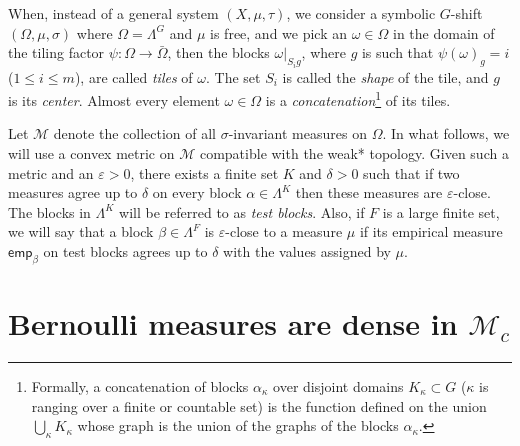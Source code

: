 \documentclass{amsart}
\newtheorem{fact}[thm]{Fact}
\theoremstyle{remark}
\def \M {\mathcal M}
\def \eps {\varepsilon}
\def \im {invariant measure}
\def \inv {invariant}
\def \emp{\mathsf{emp}}
\begin{document}
\smallskip
When, instead of a general system $(X,\mu,\tau)$, we consider a symbolic $G$-shift $(\Omega,\mu,\sigma)$ where $\Omega=\Lambda^G$ and $\mu$ is free, and we pick an $\omega\in\Omega$ in the domain of the tiling factor $\psi:\Omega\to\bar\Omega$, then the blocks $\omega|_{S_ig}$, where $g$ is such that $\psi(\omega)_g=i$ ($1\le i\le m$), are called \emph{tiles} of $\omega$. The set $S_i$ is called the \emph{shape} of the tile, and $g$ is its \emph{center}. Almost every element $\omega\in\Omega$ is a \emph{concatenation}\footnote{Formally, a concatenation of blocks $\alpha_\kappa$ over disjoint domains $K_\kappa\subset G$ ($\kappa$ is ranging over a finite or countable set) is the function defined on the union $\bigcup_\kappa K_\kappa$ whose graph is the union of the graphs of the blocks $\alpha_\kappa$.} of its tiles.
\smallskip

Let $\M$ denote the collection of all $\sigma$-\im s on $\Omega$.
In what follows, we will use a convex metric on $\M$ compatible with the weak* topology. Given such a metric and an $\eps>0$, there exists a finite set $K$ and $\delta>0$ such that if two measures agree up to $\delta$ on every block $\alpha\in\Lambda^K$  then these measures are $\eps$-close. The blocks in $\Lambda^K$ will be referred to as \emph{test blocks}. Also, if $F$ is a large finite set, we will say that a block $\beta\in\Lambda^F$ is $\eps$-close to a measure $\mu$ if its empirical measure $\emp_\beta$ on test blocks agrees  up to $\delta$ with the values assigned by $\mu$. 



\section{Bernoulli measures are dense in $\M_c$}\label{S3}
\end{document}
